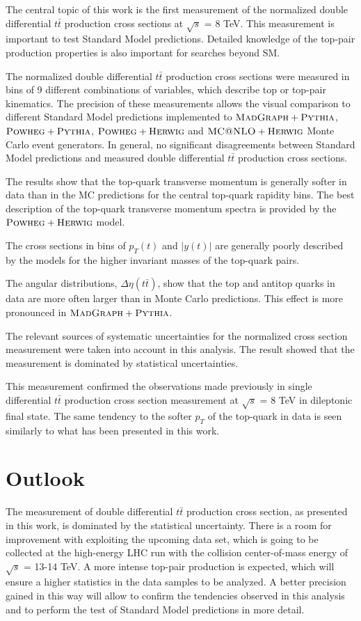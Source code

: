 The central topic of this work is the first measurement of the normalized double differential $t\bar{t}$ production cross 
sections at $\sqrt{s}$ = 8 TeV. This measurement is important to test Standard Model predictions. Detailed knowledge of the 
top-pair production properties is also important for searches beyond SM.

The normalized double differential $t\bar{t}$ production cross sections were measured in bins of 9 different combinations of
variables, which describe top or top-pair kinematics. The precision of these measurements allows the visual comparison to different 
Standard Model predictions implemented to $\textsc{MadGraph}+\textsc{Pythia}$, $\textsc{Powheg}+\textsc{Pythia}$, $\textsc{Powheg}+\textsc{Herwig}$ and $\textsc{MC@NLO}+\textsc{Herwig}$ Monte Carlo
event generators. In general, no significant disagreements between Standard Model predictions and measured double differential
$t\bar{t}$ production cross sections.

The results show that the top-quark transverse momentum is generally softer in data than in the MC predictions for the central
top-quark rapidity bins. The best description of the top-quark transverse momentum spectra is provided by the $\textsc{Powheg}+\textsc{Herwig}$
model.

The cross sections in bins of $p_{T}(t)$ and $|y(t)|$ are generally poorly described by the models for the higher invariant masses
of the top-quark pairs.

The angular distributions, $\Delta\eta(t\bar{t})$, show that the top and antitop quarks in data are more often larger
than in Monte Carlo predictions. This effect is more pronounced in $\textsc{MadGraph}+\textsc{Pythia}$. 

The relevant sources of systematic uncertainties for the normalized cross section measurement were taken into account in this analysis.
The result showed that the measurement is dominated by statistical uncertainties.

This measurement confirmed the observations made previously in single differential $t\bar{t}$ production cross section measurement
at $\sqrt{s}$ = 8 TeV\cite{Asin2014Auth} in dileptonic final state. The same tendency to the softer $p_{T}$ of the top-quark in 
data is seen similarly to what has been presented in this work.

\section{Outlook}

The measurement of double differential $t\bar{t}$ production cross section, as presented in this work, is dominated by the statistical
uncertainty. There is a room for improvement with exploiting the upcoming data set, which is going to be collected at the high-energy LHC
run with the collision center-of-mass energy of $\sqrt{s}$ = 13-14 TeV. A more intense top-pair production is expected, which will ensure
a higher statistics in the data samples to be analyzed. A better precision gained in this way will allow to confirm the tendencies 
observed in this analysis and to perform the test of Standard Model predictions in more detail.